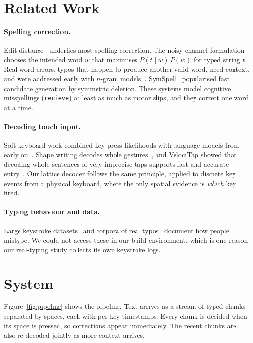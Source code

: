 \documentclass[11pt,a4paper]{article}
\newcommand{\ttw}[1]{\texttt{#1}}
\begin{document}
\section{Related Work}

\paragraph{Spelling correction.} Edit distance~\citep{damerau1964,levenshtein1966} underlies most spelling correction. The noisy-channel formulation~\citep{kernighan1990,brill2000} chooses the intended word $w$ that maximises $P(t\mid w)\,P(w)$ for typed string $t$. Real-word errors, typos that happen to produce another valid word, need context, and were addressed early with $n$-gram models~\citep{mays1991}. SymSpell~\citep{garbe2012symspell} popularised fast candidate generation by symmetric deletion. These systems model cognitive misspellings (\ttw{recieve}) at least as much as motor slips, and they correct one word at a time.

\paragraph{Decoding touch input.} Soft-keyboard work combined key-press likelihoods with language models from early on~\citep{goodman2002}. Shape writing decodes whole gestures~\citep{kristensson2004}, and VelociTap showed that decoding whole sentences of very imprecise taps supports fast and accurate entry~\citep{vertanen2015}. Our lattice decoder follows the same principle, applied to discrete key events from a physical keyboard, where the only spatial evidence is \emph{which} key fired.

\paragraph{Typing behaviour and data.} Large keystroke datasets~\citep{dhakal2018} and corpora of real typos~\citep{hagiwara2020} document how people mistype. We could not access these in our build environment, which is one reason our real-typing study collects its own keystroke logs.

\section{System}
\label{sec:system}

Figure~\ref{fig:pipeline} shows the pipeline. Text arrives as a stream of typed chunks separated by spaces, each with per-key timestamps. Every chunk is decided when its space is pressed, so corrections appear immediately. The recent chunks are also re-decoded jointly as more context arrives.
\end{document}
